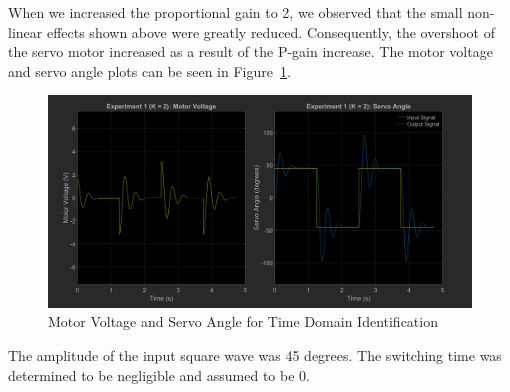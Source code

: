 \documentclass[12pt]{article}
\begin{document}
When we increased the proportional gain to 2, we observed that the small non-linear effects shown above were greatly reduced. Consequently, the overshoot of the servo motor increased as a result of the P-gain increase. The motor voltage and servo angle plots can be seen in Figure~\ref{fig:exp1}.
\begin{figure}[h!]
    \centering
    \includegraphics[width=\textwidth]{exp1}
    \caption{\label{fig:exp1}Motor Voltage and Servo Angle for Time Domain Identification}
\end{figure}

The amplitude of the input square wave was 45 degrees. The switching time was determined to be negligible and assumed to be 0.
\end{document}
